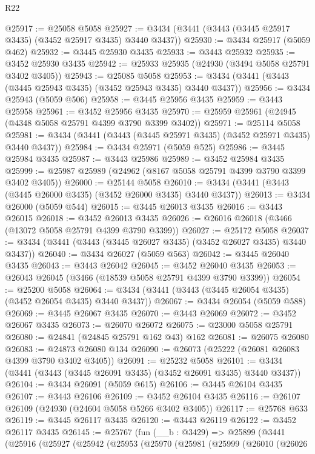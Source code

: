 \begin{lexlean}{R22}
\begin{coremodule}
@25917 := @25058 @5058
@25927 := @3434 (@3441 (@3443 (@3445 @25917 @3435) (@3452 @25917 @3435) @3440 @3437))
@25930 := @3434 @25917 (@5059 @462)
@25932 := @3445 @25930 @3435
@25933 := @3443 @25932
@25935 := @3452 @25930 @3435
@25942 := @25933 @25935 (@24930 (@3494 @5058 @25791 @3402 @3405))
@25943 := @25085 @5058
@25953 := @3434 (@3441 (@3443 (@3445 @25943 @3435) (@3452 @25943 @3435) @3440 @3437))
@25956 := @3434 @25943 (@5059 @506)
@25958 := @3445 @25956 @3435
@25959 := @3443 @25958
@25961 := @3452 @25956 @3435
@25970 := @25959 @25961 (@24945 (@4348 @5058 @25791 @4399 @3790 @3399 @3402))
@25971 := @25114 @5058
@25981 := @3434 (@3441 (@3443 (@3445 @25971 @3435) (@3452 @25971 @3435) @3440 @3437))
@25984 := @3434 @25971 (@5059 @525)
@25986 := @3445 @25984 @3435
@25987 := @3443 @25986
@25989 := @3452 @25984 @3435
@25999 := @25987 @25989 (@24962 (@8167 @5058 @25791 @4399 @3790 @3399 @3402 @3405))
@26000 := @25144 @5058
@26010 := @3434 (@3441 (@3443 (@3445 @26000 @3435) (@3452 @26000 @3435) @3440 @3437))
@26013 := @3434 @26000 (@5059 @544)
@26015 := @3445 @26013 @3435
@26016 := @3443 @26015
@26018 := @3452 @26013 @3435
@26026 := @26016 @26018 (@3466 (@13072 @5058 @25791 @4399 @3790 @3399))
@26027 := @25172 @5058
@26037 := @3434 (@3441 (@3443 (@3445 @26027 @3435) (@3452 @26027 @3435) @3440 @3437))
@26040 := @3434 @26027 (@5059 @563)
@26042 := @3445 @26040 @3435
@26043 := @3443 @26042
@26045 := @3452 @26040 @3435
@26053 := @26043 @26045 (@3466 (@18539 @5058 @25791 @4399 @3790 @3399))
@26054 := @25200 @5058
@26064 := @3434 (@3441 (@3443 (@3445 @26054 @3435) (@3452 @26054 @3435) @3440 @3437))
@26067 := @3434 @26054 (@5059 @588)
@26069 := @3445 @26067 @3435
@26070 := @3443 @26069
@26072 := @3452 @26067 @3435
@26073 := @26070 @26072
@26075 := @23000 @5058 @25791
@26080 := @24841 (@24845 @25791 @162 @43) @162
@26081 := @26075 @26080
@26083 := @24873 @26080 @134
@26090 := @26073 (@25222 (@26081 @26083 @4399 @3790 @3402 @3405))
@26091 := @25232 @5058
@26101 := @3434 (@3441 (@3443 (@3445 @26091 @3435) (@3452 @26091 @3435) @3440 @3437))
@26104 := @3434 @26091 (@5059 @615)
@26106 := @3445 @26104 @3435
@26107 := @3443 @26106
@26109 := @3452 @26104 @3435
@26116 := @26107 @26109 (@24930 (@24604 @5058 @5266 @3402 @3405))
@26117 := @25768 @633
@26119 := @3445 @26117 @3435
@26120 := @3443 @26119
@26122 := @3452 @26117 @3435
@26145 := @25767
    (fun (__b : @3429) =>
    @25899
      (@3441
        (@25916
          (@25927
            (@25942
              (@25953
                (@25970
                  (@25981
                    (@25999
                      (@26010
                        (@26026

\end{coremodule}
\end{lexlean}
